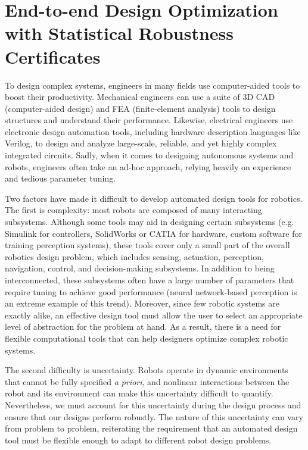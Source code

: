 \chapter{End-to-end Design Optimization with Statistical Robustness Certificates}\label{ch:rss}

To design complex systems, engineers in many fields use computer-aided tools to boost their productivity. Mechanical engineers can use a suite of 3D CAD (computer-aided design) and FEA (finite-element analysis) tools to design structures and understand their performance. Likewise, electrical engineers use electronic design automation tools, including hardware description languages like Verilog, to design and analyze large-scale, reliable, and yet highly complex integrated circuits. Sadly, when it comes to designing autonomous systems and robots, engineers often take an ad-hoc approach, relying heavily on experience and tedious parameter tuning.

Two factors have made it difficult to develop automated design tools for robotics. The first is complexity: most robots are composed of many interacting subsystems. Although some tools may aid in designing certain subsystems (e.g. Simulink for controllers, SolidWorks or CATIA for hardware, custom software for training perception systems), these tools cover only a small part of the overall robotics design problem, which includes sensing, actuation, perception, navigation, control, and decision-making subsystems. In addition to being interconnected, these subsystems often have a large number of parameters that require tuning to achieve good performance (neural network-based perception is an extreme example of this trend). Moreover, since few robotic systems are exactly alike, an effective design tool must allow the user to select an appropriate level of abstraction for the problem at hand. As a result, there is a need for flexible computational tools that can help designers optimize complex robotic systems.

The second difficulty is uncertainty. Robots operate in dynamic environments that cannot be fully specified \textit{a priori}, and nonlinear interactions between the robot and its environment can make this uncertainty difficult to quantify. Nevertheless, we must account for this uncertainty during the design process and ensure that our designs perform robustly. The nature of this uncertainty can vary from problem to problem, reiterating the requirement that an automated design tool must be flexible enough to adapt to different robot design problems.

